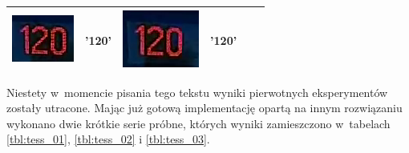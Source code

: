 \begin{table}[h!]
\begin{tabular}{| c | l | c | l | c | l |}
\begin{minipage}{.2\textwidth}
      \includegraphics[width=\textwidth]{img/exp_number_06}
    \end{minipage}
    &
    '120'
    &
    \begin{minipage}{.2\textwidth}
      \includegraphics[width=\textwidth]{img/exp_number_07}
    \end{minipage}
    &
    '120'
    \\ 
    \hline
  \end{tabular}
\end{table}

Niestety w~momencie pisania tego tekstu wyniki pierwotnych eksperymentów
zostały utracone. Mając już gotową implementację opartą na innym
rozwiązaniu wykonano dwie krótkie serie próbne, których wyniki
zamieszczono w~tabelach \ref{tbl:tess_01}, \ref{tbl:tess_02} i \ref{tbl:tess_03}.


